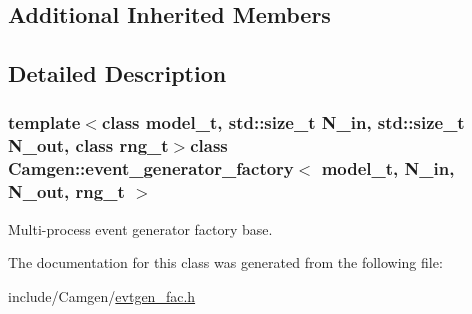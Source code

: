 \subsection*{Additional Inherited Members}


\subsection{Detailed Description}
\subsubsection*{template$<$class model\+\_\+t, std\+::size\+\_\+t N\+\_\+in, std\+::size\+\_\+t N\+\_\+out, class rng\+\_\+t$>$class Camgen\+::event\+\_\+generator\+\_\+factory$<$ model\+\_\+t, N\+\_\+in, N\+\_\+out, rng\+\_\+t $>$}

Multi-\/process event generator factory base. 

The documentation for this class was generated from the following file\+:\begin{DoxyCompactItemize}
\item 
include/\+Camgen/\hyperlink{a00635}{evtgen\+\_\+fac.\+h}\end{DoxyCompactItemize}
